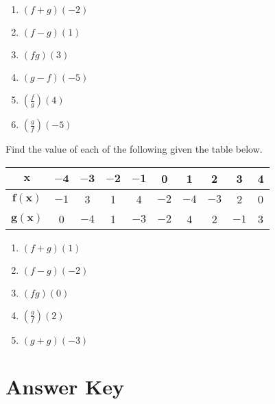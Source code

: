 \begin{multicols}{6}
\begin{enumerate}	\setcounter{enumi}{\value{Review}}
	\item $(f + g)(-2)$
	\item $(f - g)(1)$
	\item $(fg)(3)$
	\item $(g - f)(-5)$
	\item $\left(\frac{f}{g}\right)(4)$
	\item $\left(\frac{g}{f}\right)(-5)$
\end{enumerate}	\setcounter{Review}{\value{enumi}}
\end{multicols}

Find the value of each of the following given the table below.
\begin{center}
\begin{tabular}{c|c|c|c|c|c|c|c|c|c}
    $\mathbf{x}$ & $\mathbf{-4}$ & $\mathbf{-3}$ & $\mathbf{-2}$ & $\mathbf{-1}$ & \textbf{0} & \textbf{1} & \textbf{2} & \textbf{3} & \textbf{4} \\ \hline
    $\mathbf{f(x)}$ & $-1$ & 3 & 1 & 4 & $-2$ & $-4$ & $-3$ & 2 & 0 \\ \hline
    $\mathbf{g(x)}$ & 0 & $-4$ & 1 & $-3$ & $-2$ & 4 & 2 & $-1$ & 3 \\
\end{tabular}
\end{center}

\begin{multicols}{5}
\begin{enumerate}	\setcounter{enumi}{\value{Review}}
	\item $(f + g)(1)$
	\item $(f - g)(-2)$
	\item $(fg)(0)$
	\item $\left(\frac{g}{f}\right)(2)$
	\item $(g + g)(-3)$
\end{enumerate}		\setcounter{Review}{\value{enumi}}
\end{multicols}

\newpage

\section{Answer Key}

